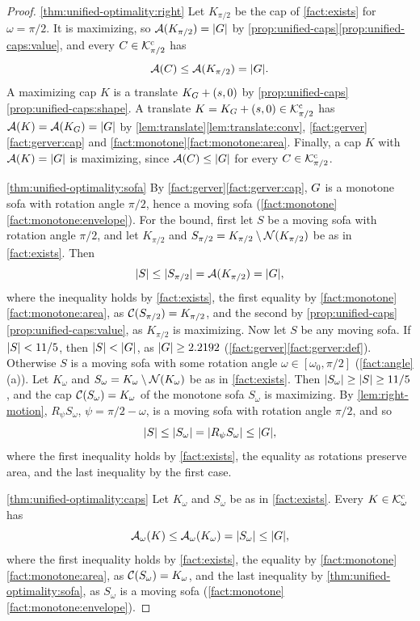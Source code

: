 \begin{proof}
\ref{thm:unified-optimality:right} Let $K_{\pi/2}$ be the cap of
\cref{fact:exists} for $\omega=\pi/2$. It is maximizing, so
$\mathcal{A}(K_{\pi/2})=\lvert G\rvert$ by
\cref{prop:unified-caps}\ref{prop:unified-caps:value}, and every
$C\in\mathcal{K}^{\mathrm{c}}_{\pi/2}$ has
\[
  \mathcal{A}(C)\le\mathcal{A}(K_{\pi/2})=\lvert G\rvert.
\]
A maximizing cap $K$ is a translate $K_G+(s,0)$ by
\cref{prop:unified-caps}\ref{prop:unified-caps:shape}. A translate
$K=K_G+(s,0)\in\mathcal{K}^{\mathrm{c}}_{\pi/2}$ has $\mathcal{A}(K)=\mathcal{A}(K_G)=\lvert G\rvert$ by
\cref{lem:translate}\ref{lem:translate:conv},
\cref{fact:gerver}\ref{fact:gerver:cap} and
\cref{fact:monotone}\ref{fact:monotone:area}. Finally, a cap $K$ with
$\mathcal{A}(K)=\lvert G\rvert$ is maximizing, since $\mathcal{A}(C)\le\lvert G\rvert$ for every
$C\in\mathcal{K}^{\mathrm{c}}_{\pi/2}$.

\ref{thm:unified-optimality:sofa} By \cref{fact:gerver}\ref{fact:gerver:cap},
$G$ is a monotone sofa with rotation angle $\pi/2$, hence a moving sofa
(\cref{fact:monotone}\ref{fact:monotone:envelope}). For the bound, first let
$S$ be a moving sofa with rotation angle $\pi/2$, and let $K_{\pi/2}$ and
$S_{\pi/2}=K_{\pi/2}\setminus\mathcal{N}(K_{\pi/2})$ be as in \cref{fact:exists}. Then
\[
  \lvert S\rvert\le\lvert S_{\pi/2}\rvert=\mathcal{A}(K_{\pi/2})=\lvert G\rvert ,
\]
where the inequality holds by \cref{fact:exists}, the first equality by
\cref{fact:monotone}\ref{fact:monotone:area}, as $\mathcal{C}(S_{\pi/2})=K_{\pi/2}$, and
the second by \cref{prop:unified-caps}\ref{prop:unified-caps:value}, as
$K_{\pi/2}$ is maximizing. Now let $S$ be any moving sofa. If $\lvert S\rvert<11/5$,
then $\lvert S\rvert<\lvert G\rvert$, as $\lvert G\rvert\ge2.2192$
(\cref{fact:gerver}\ref{fact:gerver:def}). Otherwise $S$ is a moving sofa with
some rotation angle $\omega\in[\omega_0,\pi/2]$ (\cref{fact:angle}(a)). Let
$K_\omega$ and $S_\omega=K_\omega\setminus\mathcal{N}(K_\omega)$ be as in
\cref{fact:exists}. Then
$\lvert S_\omega\rvert\ge\lvert S\rvert\ge11/5$, and the cap $\mathcal{C}(S_\omega)=K_\omega$ of the
monotone sofa $S_\omega$ is maximizing. By \cref{lem:right-motion},
$R_\psi S_\omega$, $\psi=\pi/2-\omega$, is a moving sofa with rotation angle
$\pi/2$, and so
\[
  \lvert S\rvert\le\lvert S_\omega\rvert=\lvert R_\psi S_\omega\rvert\le\lvert G\rvert ,
\]
where the first inequality holds by \cref{fact:exists}, the equality as
rotations preserve area, and the last inequality by the first case.

\ref{thm:unified-optimality:caps} Let $K_\omega$ and $S_\omega$ be as in
\cref{fact:exists}. Every $K\in\mathcal{K}^{\mathrm{c}}_\omega$ has
\[
  \mathcal{A}_\omega(K)\le\mathcal{A}_\omega(K_\omega)=\lvert S_\omega\rvert\le\lvert G\rvert ,
\]
where the first inequality holds by \cref{fact:exists}, the equality by
\cref{fact:monotone}\ref{fact:monotone:area}, as $\mathcal{C}(S_\omega)=K_\omega$, and
the last inequality by \ref{thm:unified-optimality:sofa}, as $S_\omega$ is a
moving sofa (\cref{fact:monotone}\ref{fact:monotone:envelope}).
\end{proof}

